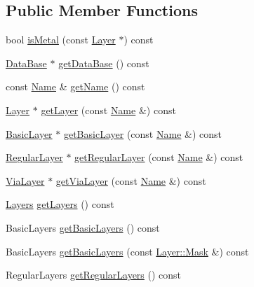 \subsection*{Public Member Functions}
\begin{DoxyCompactItemize}
\item 
bool \hyperlink{classHurricane_1_1Technology_ae5590e455d35f76531a6feb0c0f111a2}{is\+Metal} (const \hyperlink{classHurricane_1_1Layer}{Layer} $\ast$) const
\item 
\hyperlink{classHurricane_1_1DataBase}{Data\+Base} $\ast$ \hyperlink{classHurricane_1_1Technology_acf836e738fba14fa493b0e08148cc3ee}{get\+Data\+Base} () const
\item 
const \hyperlink{classHurricane_1_1Name}{Name} \& \hyperlink{classHurricane_1_1Technology_ae466071aa1991c853ee71af12fa62d4e}{get\+Name} () const
\item 
\hyperlink{classHurricane_1_1Layer}{Layer} $\ast$ \hyperlink{classHurricane_1_1Technology_a4ec69c9f8f6b483885f1900c56a97b61}{get\+Layer} (const \hyperlink{classHurricane_1_1Name}{Name} \&) const
\item 
\hyperlink{classHurricane_1_1BasicLayer}{Basic\+Layer} $\ast$ \hyperlink{classHurricane_1_1Technology_ab096154ce9485cef02244f0037efd4fb}{get\+Basic\+Layer} (const \hyperlink{classHurricane_1_1Name}{Name} \&) const
\item 
\hyperlink{classHurricane_1_1RegularLayer}{Regular\+Layer} $\ast$ \hyperlink{classHurricane_1_1Technology_a0e93f2f749ee9b6efd30de4ef74546cc}{get\+Regular\+Layer} (const \hyperlink{classHurricane_1_1Name}{Name} \&) const
\item 
\hyperlink{classHurricane_1_1ViaLayer}{Via\+Layer} $\ast$ \hyperlink{classHurricane_1_1Technology_a9edd085c08487642dd8745b66cf40c76}{get\+Via\+Layer} (const \hyperlink{classHurricane_1_1Name}{Name} \&) const
\item 
\hyperlink{namespaceHurricane_a7b7200a36ab7ce8a157ddbe78b625f38}{Layers} \hyperlink{classHurricane_1_1Technology_a4e58c5ae8e3e82d7fe1b3bb939d6a633}{get\+Layers} () const
\item 
Basic\+Layers \hyperlink{classHurricane_1_1Technology_a7fccff9da6604fafb90408ba56184fc0}{get\+Basic\+Layers} () const
\item 
Basic\+Layers \hyperlink{classHurricane_1_1Technology_a997457824046ea63eba51210a8e23f85}{get\+Basic\+Layers} (const \hyperlink{classHurricane_1_1Layer_af5277c670637bd5d910237e7afe01a91}{Layer\+::\+Mask} \&) const
\item 
Regular\+Layers \hyperlink{classHurricane_1_1Technology_abffce542bc1cee054b4a09c64449f3b8}{get\+Regular\+Layers} () const

\end{DoxyCompactItemize}
